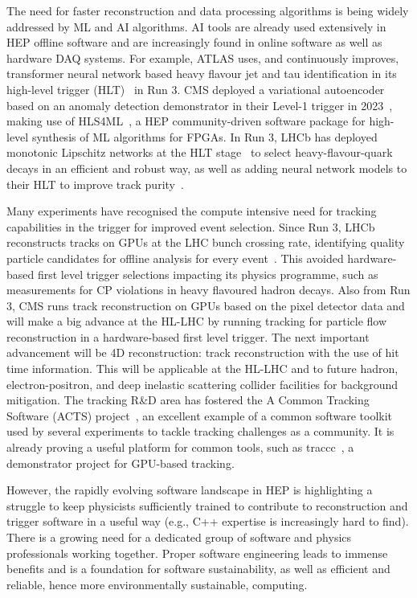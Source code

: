 \documentclass[10pt,a4paper]{article}
\begin{document}
The need for faster reconstruction and data processing algorithms is being
widely addressed by ML and AI algorithms. AI tools are already used extensively
in HEP offline software and are increasingly found in online software as well as
hardware DAQ systems. For example, ATLAS uses, and continuously improves, transformer 
neural network based heavy flavour jet and tau identification in its high-level
trigger (HLT)~\cite{ATLAS:perf_commissioning} in Run 3.
CMS deployed a variational autoencoder based on
an anomaly detection demonstrator in their Level-1 trigger in 2023~\cite{CMS-DP-2023-079},
making use of HLS4ML~\cite{fastml_team_hls4ml}, a HEP community-driven
software package for high-level synthesis of ML algorithms for FPGAs. In Run 3,
LHCb has deployed monotonic Lipschitz networks at the HLT
stage~\cite{LHCb:Lipschitz} to select heavy-flavour-quark decays in an efficient
and robust way, as well as adding neural network models to their HLT to
improve track purity~\cite{neuralmodelHLT1LHCb}.

Many experiments have recognised the compute intensive need for tracking
capabilities in the trigger for improved event selection. Since Run 3, LHCb
reconstructs tracks on GPUs at the LHC bunch crossing rate, identifying quality
particle candidates for offline analysis for every event~\cite{LHCb:HLT}. This
avoided hardware-based first level trigger selections impacting its
physics programme, such as measurements for CP violations in heavy flavoured
hadron decays. Also from Run 3, CMS runs track reconstruction on GPUs based on the
pixel detector data and will make a big advance at the HL-LHC
by running tracking for particle flow reconstruction in a hardware-based
first level trigger. The next important advancement will be 4D reconstruction:
track reconstruction with the use of hit time information. This will be
applicable at the HL-LHC and to future hadron, electron-positron, and deep
inelastic scattering collider facilities for background mitigation. The tracking
R\&D area has fostered the A Common Tracking Software (ACTS) project~\cite{Ai2022Common},
an excellent example of a common software toolkit used by several experiments to
tackle tracking challenges as a community. It is already proving a useful
platform for common tools, such as traccc~\cite{yeo_2023_8119769, traccc}, a
demonstrator project for GPU-based tracking.

However, the rapidly evolving software landscape in HEP is highlighting a
struggle to keep physicists sufficiently trained to contribute to reconstruction
and trigger software in a useful way (e.g., C++ expertise is increasingly hard to find). 
There is a growing need for a dedicated group of software and
physics professionals working together. Proper software engineering leads to
immense benefits and is a foundation for software sustainability, as well as
efficient and reliable, hence more environmentally sustainable, computing.
\end{document}
